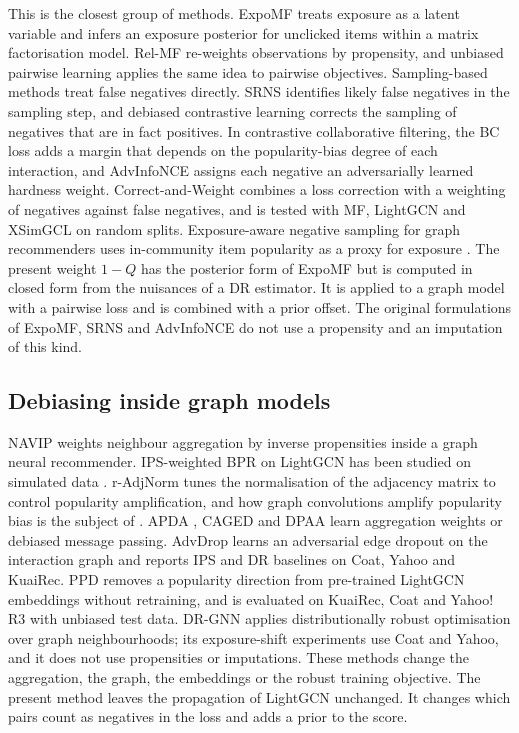 This is the closest group of methods. ExpoMF \citep{liang2016exposure} treats exposure
as a latent variable and infers an exposure posterior for unclicked items within a
matrix factorisation model. Rel-MF \citep{saito2020unbiased} re-weights observations
by propensity, and unbiased pairwise learning \citep{saito2020ictir} applies the same
idea to pairwise objectives. Sampling-based methods treat false negatives directly.
SRNS \citep{ding2020srns} identifies likely false negatives in the sampling step, and
debiased contrastive learning \citep{chuang2020dcl} corrects the sampling of negatives
that are in fact positives. In contrastive collaborative filtering, the BC loss
\citep{zhang2022bc} adds a margin that depends on the popularity-bias degree of each
interaction, and AdvInfoNCE \citep{zhang2023advinfonce} assigns each negative an
adversarially learned hardness weight. Correct-and-Weight \citep{yin2026cw} combines a loss
correction with a weighting of negatives against false negatives, and is tested with MF,
LightGCN and XSimGCL on random splits. Exposure-aware negative sampling for graph
recommenders uses in-community item popularity as a proxy for exposure \citep{chen2026icpns}.
The present weight $1-Q$ has the posterior form of ExpoMF but is computed in closed form
from the nuisances of a DR estimator. It is applied to a graph model with a pairwise
loss and is combined with a prior offset. The original formulations of ExpoMF, SRNS and
AdvInfoNCE do not use a propensity and an imputation of this kind.

\subsection{Debiasing inside graph models}

NAVIP \citep{kim2022navip} weights neighbour aggregation by inverse propensities inside
a graph neural recommender. IPS-weighted BPR on LightGCN has been studied on simulated
data \citep{raja2025ipsbpr}. r-AdjNorm \citep{zhao2022radjnorm} tunes the normalisation
of the adjacency matrix to control popularity amplification, and how graph convolutions
amplify popularity bias is the subject of \citet{chen2024gcnpop}. APDA
\citep{zhou2023apda}, CAGED \citep{que2025caged} and DPAA \citep{dpaa2026} learn
aggregation weights or debiased message passing. AdvDrop \citep{zhang2024advdrop} learns an
adversarial edge dropout on the interaction graph and reports IPS and DR baselines on
Coat, Yahoo and KuaiRec. PPD \citep{islam2026ppd} removes a popularity direction from
pre-trained LightGCN embeddings without retraining, and is evaluated on KuaiRec, Coat and
Yahoo! R3 with unbiased test data. DR-GNN \citep{wang2024drgnn} applies distributionally
robust optimisation over graph neighbourhoods; its exposure-shift experiments use Coat and
Yahoo, and it does not use propensities or imputations. These methods change the
aggregation, the graph, the embeddings or the robust training objective. The present method
leaves the propagation of LightGCN unchanged. It changes which pairs count as negatives in
the loss and adds a prior to the score.

